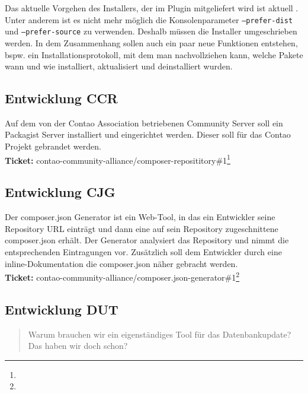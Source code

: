 \documentclass[
paper=a4,
draft=false,%
fontsize=10pt%
]{scrartcl}
\begin{document}
Das aktuelle Vorgehen des Installers, der im Plugin mitgeliefert wird ist aktuell . Unter anderem ist es nicht mehr möglich die Konsolenparameter \texttt{--prefer-dist} und \texttt{--prefer-source} zu verwenden. Deshalb müssen die Installer umgeschrieben werden. In dem Zusammenhang sollen auch ein paar neue Funktionen entstehen, bspw. ein Installationsprotokoll, mit dem man nachvollziehen kann, welche Pakete wann und wie installiert, aktualisiert und deinstalliert wurden.

\subsection{Entwicklung CCR}

Auf dem von der Contao Association betriebenen Community Server soll ein Packagist Server installiert und eingerichtet werden. Dieser soll für das Contao Projekt gebrandet werden.\\
\textbf{Ticket:} contao-community-alliance/composer-reposititory\#1\footnote{}

\subsection{Entwicklung CJG}

Der composer.json Generator ist ein Web-Tool, in das ein Entwickler seine Repository URL einträgt und dann eine auf sein Repository zugeschnittene composer.json erhält. Der Generator analysiert das Repository und nimmt die entsprechenden Eintragungen vor. Zusätzlich soll dem Entwickler durch eine inline-Dokumentation die composer.json näher gebracht werden.\\
\textbf{Ticket:} contao-community-alliance/composer.json-generator\#1\footnote{}

\subsection{Entwicklung DUT}

\begin{quotation}
Warum brauchen wir ein eigenständiges Tool für das Datenbankupdate? Das haben wir doch schon?
\end{quotation}
\end{document}
